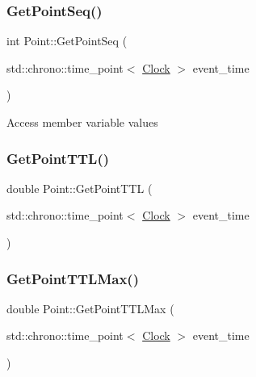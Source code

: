 \mbox{\label{classPoint_a04bae1bb3475d1e5d97ddd7b2dae40aa}} 
\subsubsection{\texorpdfstring{Get\+Point\+Seq()}{GetPointSeq()}}
{\footnotesize\ttfamily int Point\+::\+Get\+Point\+Seq (\begin{DoxyParamCaption}\item[{std\+::chrono\+::time\+\_\+point$<$ \mbox{\hyperlink{universe_8h_a0ef8d951d1ca5ab3cfaf7ab4c7a6fd80}{Clock}} $>$}]{event\+\_\+time }\end{DoxyParamCaption})\hspace{0.3cm}{\ttfamily [inline]}}

Access member variable values \mbox{\label{classPoint_a72cf99a391fc3d6ea8f4252f4f92c19f}} 
\subsubsection{\texorpdfstring{Get\+Point\+T\+T\+L()}{GetPointTTL()}}
{\footnotesize\ttfamily double Point\+::\+Get\+Point\+T\+TL (\begin{DoxyParamCaption}\item[{std\+::chrono\+::time\+\_\+point$<$ \mbox{\hyperlink{universe_8h_a0ef8d951d1ca5ab3cfaf7ab4c7a6fd80}{Clock}} $>$}]{event\+\_\+time }\end{DoxyParamCaption})\hspace{0.3cm}{\ttfamily [inline]}}

\mbox{\label{classPoint_a0800eea77109f6fbb1220b4d551a70d3}} 
\subsubsection{\texorpdfstring{Get\+Point\+T\+T\+L\+Max()}{GetPointTTLMax()}}
{\footnotesize\ttfamily double Point\+::\+Get\+Point\+T\+T\+L\+Max (\begin{DoxyParamCaption}\item[{std\+::chrono\+::time\+\_\+point$<$ \mbox{\hyperlink{universe_8h_a0ef8d951d1ca5ab3cfaf7ab4c7a6fd80}{Clock}} $>$}]{event\+\_\+time }\end{DoxyParamCaption})\hspace{0.3cm}{\ttfamily [inline]}}

